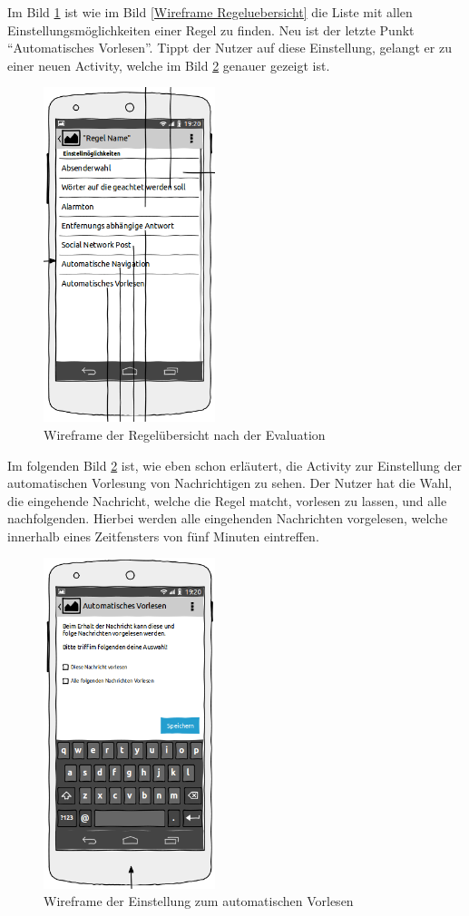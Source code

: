 Im Bild \ref{Wireframe Regeluebersicht nach Eval} ist wie im Bild \ref{Wireframe Regeluebersicht} die Liste mit allen Einstellungsm\"oglichkeiten einer Regel zu finden. Neu ist der letzte Punkt "`Automatisches Vorlesen"'. Tippt der Nutzer auf diese Einstellung, gelangt er zu einer neuen Activity, welche im Bild \ref{Wireframe Vorlesen} genauer gezeigt ist.
\begin{figure}[!ht]
\centering
\includegraphics[width=5cm]{Bilder/WireFrame_RegelauswahlNachEvaluation.png}
\caption{Wireframe der Regel\"ubersicht nach der Evaluation}
\label{Wireframe Regeluebersicht nach Eval}
\centering
\end{figure}

Im folgenden Bild \ref{Wireframe Vorlesen} ist, wie eben schon erl\"autert, die Activity zur Einstellung der automatischen Vorlesung von Nachrichtigen zu sehen.
Der Nutzer hat die Wahl, die eingehende Nachricht, welche die Regel matcht, vorlesen zu lassen, und alle nachfolgenden. Hierbei werden alle eingehenden Nachrichten vorgelesen, welche innerhalb eines Zeitfensters von f\"unf Minuten eintreffen.
\begin{figure}[!ht]
\centering
\includegraphics[width=5cm]{Bilder/WireFrameVorlesen.png}
\caption{Wireframe der Einstellung zum automatischen Vorlesen}
\label{Wireframe Vorlesen}
\centering
\end{figure}
\FloatBarrier

